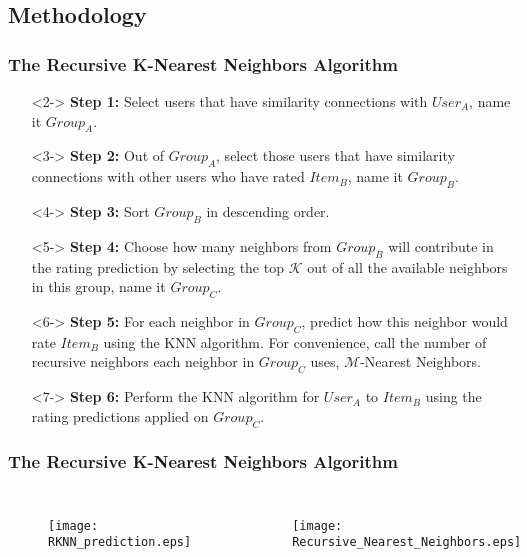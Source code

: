 \subsection{Methodology}
\begin{frame}
    \frametitle{The Recursive K-Nearest Neighbors Algorithm}
    \vspace{-1cm}
    \begin{itemize}
    \item[]<2-> \textbf{Step 1:} Select users that have similarity connections with $User_A$, name it $Group_A$.
    \item[]<3-> \textbf{Step 2:} Out of $Group_A$, select those users that have similarity connections with
	other users who have rated $Item_B$, name it $Group_B$.
    \item[]<4-> \textbf{Step 3:}  Sort $Group_B$ in descending order.
    \item[]<5-> \textbf{Step 4:}  Choose how many neighbors from $Group_B$ will contribute in the
	rating prediction by selecting the top $\mathcal{K}$ out of all the available
	neighbors in this group, name it $Group_C$.
    \item[]<6-> \textbf{Step 5:} For each neighbor in $Group_C$, predict how this neighbor would
	rate $Item_B$ using the KNN algorithm. For convenience, call the number of recursive
	neighbors each neighbor in $Group_C$ uses, $\mathcal{M}$-Nearest Neighbors.
    \item[]<7-> \textbf{Step 6:} Perform the KNN algorithm for $User_A$ to $Item_B$
    using the rating predictions applied on $Group_C$.
\end{itemize}
\end{frame}
\begin{frame}
    \frametitle{The Recursive K-Nearest Neighbors Algorithm}
    \vspace{-1cm}
    \begin{columns}
        \begin{figure}
        \centering
        \texttt{[image: RKNN\_prediction.eps]}
        \end{figure}
        \begin{figure}
        \centering
        \texttt{[image: Recursive\_Nearest\_Neighbors.eps]}
        \end{figure}
    \end{columns}

\end{frame}
